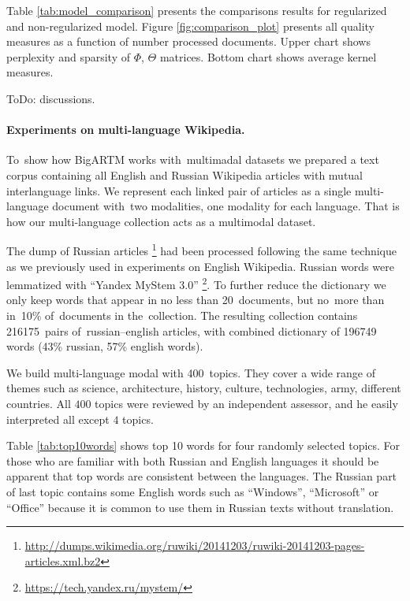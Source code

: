 \documentclass[russian]{llncs}
\begin{document}
Table \ref{tab:model_comparison} presents the comparisons results for regularized and non-regularized model.
Figure \ref{fig:comparison_plot} presents all quality measures as a function of number processed documents.
Upper chart shows perplexity and sparsity of $\Phi$, $\Theta$ matrices.
Bottom chart shows average kernel measures.

{\color{red}ToDo: discussions.}

\paragraph{Experiments on multi-language Wikipedia.}

To~show how BigARTM works with~multimadal datasets we prepared a text corpus
containing all English and Russian Wikipedia articles with mutual interlanguage links.
We represent each linked pair of articles
as a single multi-language document with~two modalities, one modality for each language.
That is how our multi-language collection acts as a multimodal dataset.

The dump of Russian articles \footnote{\url{http://dumps.wikimedia.org/ruwiki/20141203/ruwiki-20141203-pages-articles.xml.bz2}}
had been processed following the same technique as we previously used in experiments on English Wikipedia.
Russian words were lemmatized with ``Yandex MyStem 3.0'' \footnote{\url{https://tech.yandex.ru/mystem/}}.
To further reduce the dictionary we only keep words
that appear in no less than 20~documents, but no~more than in~10\% of~documents in the~collection.
The resulting collection contains 216175~pairs of~russian--english articles, with combined dictionary
of 196749 words (43\% russian, 57\% english words).

We build multi-language modal with 400~topics.
They cover a wide range of themes such as science, architecture, history, culture, technologies, army, different countries.
All $400$ topics were reviewed by an independent assessor, and he easily interpreted all except $4$ topics.

Table \ref{tab:top10words} shows top 10 words for four randomly selected topics.
For those who are familiar with both Russian and English languages it should be apparent that top words are consistent between the languages.
The Russian part of last topic contains some English words such as
``Windows'', ``Microsoft'' or ``Office'' because it is common to use them in Russian texts without translation.
\end{document}
